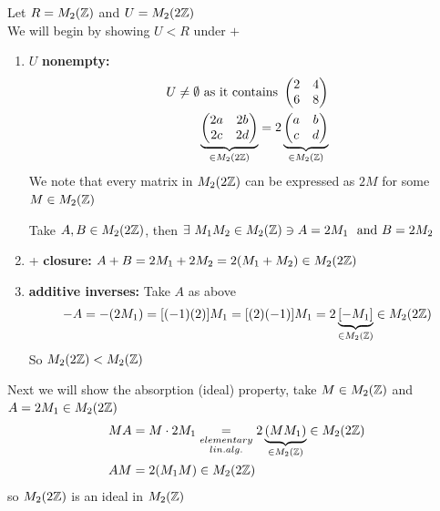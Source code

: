 \begin{example}
Let $R=M_2({\mathbb{Z}})$ and $U=M_2(2{\mathbb{Z}})$ \\
We will begin by showing $U<R$ under $+$
\begin{enumerate}[label=\roman*)]
    \item $U$ \textbf{nonempty: }\begin{align}
    U\neq \emptyset \text{ as it contains } \begin{pmatrix}
        2&4\\6&8
    \end{pmatrix} \nonumber \\
    \underbrace{\begin{pmatrix}
        2a & 2b \\ 2c & 2d
    \end{pmatrix}}_{\in M_2(2{\mathbb{Z}})} = 2 \underbrace{\begin{pmatrix}
        a&b \\ c& d
    \end{pmatrix}}_{\in M_2({\mathbb{Z}})} \nonumber
\end{align}
We note that every matrix in $M_2(2{\mathbb{Z}})$ can be expressed as $2M$ for some $M \in M_2({\mathbb{Z}})$
\steezybreak

\noindent Take $A,B \in M_2(2{\mathbb{Z}})$, then
$\exists \ M_1 M_2 \in M_2({\mathbb{Z}}) \ni A=2M_1 \ \text{ and } B=2M_2$
\item + \textbf{closure:} $A+B=2M_1+2M_2 = 2(M_1+M_2) \in M_2(2{\mathbb{Z}})$
\item \textbf{additive inverses:} Take $A$ as above
\begin{align}
    -A= -(2M_1)=[(-1)(2)]M_1=[(2)(-1)]M_1 = 2\underbrace{[-M_1]}_{\in M_2({\mathbb{Z}})} \in M_2(2{\mathbb{Z}}) \nonumber
\end{align}
So $M_2(2{\mathbb{Z}})<M_2({\mathbb{Z}})$
\end{enumerate}
Next we will show the absorption (ideal) property, take $M\in M_2({\mathbb{Z}})$ and $A=2M_1\in M_2(2{\mathbb{Z}})$
\begin{align}
    MA &= M\cdot 2M_1 \underset{\substack{elementary \\lin. alg.}}{=} 2\underbrace{(MM_1)}_{\in M_2({\mathbb{Z}})} \in M_2(2{\mathbb{Z}}) \nonumber \\
    AM &= 2(M_1M) \in M_2(2{\mathbb{Z}}) \nonumber
\end{align}
so $M_2(2{\mathbb{Z}})$ is an ideal in $M_2({\mathbb{Z}})$
\end{example}

